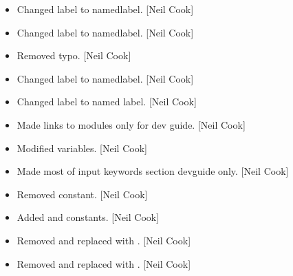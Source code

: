 \documentclass[a4paper,10pt,english]{report}
\begin{document}
\begin{itemize}
\item {} 
Changed label to namedlabel. {[}Neil Cook{]}

\item {} 
Changed label to namedlabel. {[}Neil Cook{]}

\item {} 
Removed typo. {[}Neil Cook{]}

\item {} 
Changed label to namedlabel. {[}Neil Cook{]}

\item {} 
Changed label to named label. {[}Neil Cook{]}

\item {} 
Made links to modules only for dev guide. {[}Neil Cook{]}

\item {} 
Modified variables. {[}Neil Cook{]}

\item {} 
Made most of input keywords section devguide only. {[}Neil Cook{]}

\item {} 
Removed  constant. {[}Neil Cook{]}

\item {} 
Added  and  constants. {[}Neil Cook{]}

\item {} 
Removed  and replaced with . {[}Neil Cook{]}

\item {} 
Removed  and replaced with . {[}Neil Cook{]}

\end{itemize}
\end{document}
